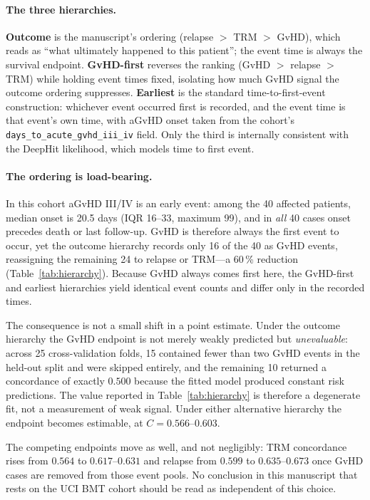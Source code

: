 \documentclass[11pt,a4paper]{article}
\begin{document}
\paragraph{The three hierarchies.}
\textbf{Outcome} is the manuscript's ordering (relapse $>$ TRM $>$ GvHD),
which reads as ``what ultimately happened to this patient''; the event time is
always the survival endpoint.  \textbf{GvHD-first} reverses the ranking
(GvHD $>$ relapse $>$ TRM) while holding event times fixed, isolating how much
GvHD signal the outcome ordering suppresses.  \textbf{Earliest} is the
standard time-to-first-event construction: whichever event occurred first is
recorded, and the event time is that event's own time, with aGvHD onset taken
from the cohort's \texttt{days\_to\_acute\_gvhd\_iii\_iv} field.  Only the
third is internally consistent with the DeepHit likelihood, which models time
to first event.

\paragraph{The ordering is load-bearing.}
In this cohort aGvHD III/IV is an early event: among the 40 affected patients,
median onset is 20.5 days (IQR 16--33, maximum 99), and in \emph{all} 40 cases
onset precedes death or last follow-up.  GvHD is therefore always the first
event to occur, yet the outcome hierarchy records only 16 of the 40 as GvHD
events, reassigning the remaining 24 to relapse or TRM---a 60\,\% reduction
(Table~\ref{tab:hierarchy}).  Because GvHD always comes first here, the
GvHD-first and earliest hierarchies yield identical event counts and differ
only in the recorded times.

The consequence is not a small shift in a point estimate.  Under the outcome
hierarchy the GvHD endpoint is not merely weakly predicted but
\emph{unevaluable}: across 25 cross-validation folds, 15 contained fewer than
two GvHD events in the held-out split and were skipped entirely, and the
remaining 10 returned a concordance of exactly $0.500$ because the fitted
model produced constant risk predictions.  The value reported in
Table~\ref{tab:hierarchy} is therefore a degenerate fit, not a measurement of
weak signal.  Under either alternative hierarchy the endpoint becomes
estimable, at $C = 0.566$--$0.603$.

The competing endpoints move as well, and not negligibly: TRM concordance
rises from $0.564$ to $0.617$--$0.631$ and relapse from $0.599$ to
$0.635$--$0.673$ once GvHD cases are removed from those event pools.  No
conclusion in this manuscript that rests on the UCI BMT cohort should be read
as independent of this choice.
\end{document}
